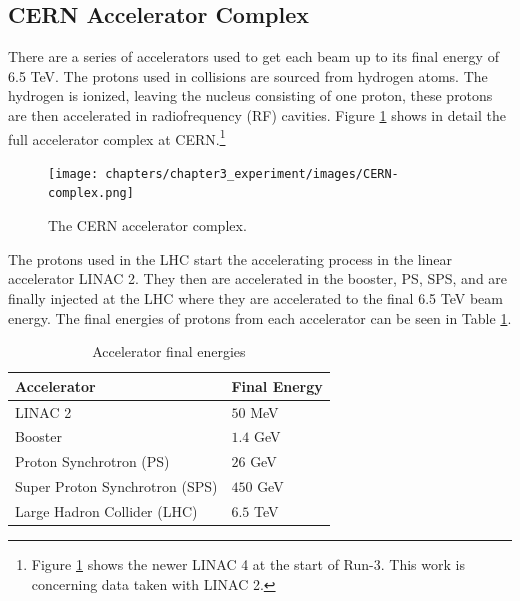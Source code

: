 	\subsection{CERN Accelerator Complex}\label{ssec:cern-accelerators}
		There are a series of accelerators used to get each beam up to its final energy of 6.5 TeV. The protons used in collisions are sourced from hydrogen atoms. The hydrogen is ionized, leaving the nucleus consisting of one proton, these protons are then accelerated in radiofrequency (RF) cavities. Figure \ref{fig:CERN-complex} shows in detail the full accelerator complex at CERN.\footnote{Figure \ref{fig:CERN-complex} shows the newer LINAC 4 at the start of Run-3. This work is concerning data taken with LINAC 2.} 
		\begin{figure}[!ht]
		\centering
		\texttt{[image: chapters/chapter3\_experiment/images/CERN-complex.png]}
		\caption{The CERN accelerator complex. \cite{CERN-complex}}
		\label{fig:CERN-complex}
		\end{figure}
		The protons used in the LHC start the accelerating process in the linear accelerator LINAC 2. They then are accelerated in the booster, PS, SPS, and are finally injected at the LHC where they are accelerated to the final 6.5 TeV beam energy. The final energies of protons from each accelerator can be seen in Table \ref{tab:accelerator-complex}.
		\begin{table}[!thp]
			\centering
			\caption{Accelerator final energies}
			\begin{tabular}{| l | l |}  
			\hline
			Accelerator 					& Final Energy 	\\ \hline
			\hline
			LINAC 2 						& $50$ MeV 		\\ 	\hline
			Booster 						& $1.4$ GeV 	\\ 	\hline
			Proton Synchrotron (PS)			& $26$ GeV 		\\ 	\hline
			Super Proton Synchrotron (SPS) 	& $450$ GeV 	\\ 	\hline
			Large Hadron Collider (LHC)		& $6.5$ TeV 	\\ 	\hline
			\end{tabular}
			\label{tab:accelerator-complex}
		\end{table}

